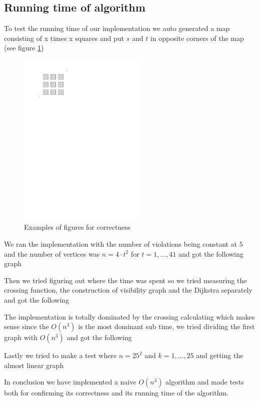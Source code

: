 \subsection{Running time of algorithm}
To test the running time of our implementation we auto generated a map consisting of
x times x squares and put $s$ and $t$ in opposite corners of the map (see figure
\ref{fig:test})

\begin{figure}[H]
    \centering
	\includegraphics[width=6cm]{figures/testexample.pdf}
	\caption{Examples of figures for correctness}
	\label{fig:test}
\end{figure}
\label{testfilegeneration}
We ran the implementation with the number of violations being constant at $5$ and the
number of vertices was $n= 4 \cdot t^2$ for $t=1,\dots,41$ and got the following graph

\begin{center}

\end{center}

Then we tried figuring out where the time was spent so we tried measuring the
crossing function, the construction of visibility graph and the Dijkstra
separately and got the following

\begin{center}

\end{center}

The implementation is totally dominated by the crossing calculating which makes
sense since the $O(n^3)$ is the most dominant sub time, we tried dividing the first graph
with $O(n^3)$ and got the following

\begin{center}

\end{center}

Lastly we tried to make a test where $n=25^2$ and $k=1,\dots,25$ and getting
the almost linear graph

\begin{center}

\end{center}

In conclusion we have implemented a naive $O(n^3)$ algorithm and made tests both
for confirming its correctness and its running time of the algorithm.
